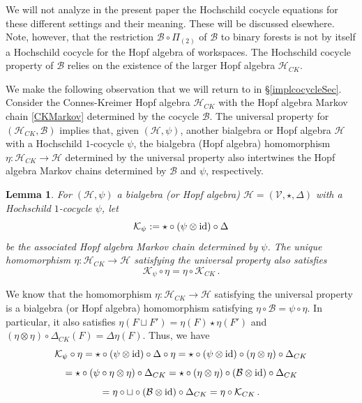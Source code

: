 \documentclass[12pt]{amsart}
\newtheorem{lem}[thm]{Lemma}
\numberwithin{equation}{section}
\def\cB{{\mathcal B}}
\def\cH{{\mathcal H}}
\def\cK{{\mathcal K}}
\def\cV{{\mathcal V}}
\begin{document}
We will not analyze in the present paper the Hochschild cocycle equations for
these different settings and their meaning. These will be discussed elsewhere.
Note, however, that the restriction $\cB \circ \Pi_{(2)}$ of $\cB$ to binary forests
is not by itself a Hochschild cocycle for the Hopf algebra of workspaces. The
Hochschild cocycle property of $\cB$ relies on the existence of the larger
Hopf algebra $\cH_{CK}$. 

\smallskip

We make the following observation that we will return to in \S \ref{implcocycleSec}.
Consider the Connes-Kreimer Hopf algebra $\cH_{CK}$ with the Hopf algebra Markov
chain \eqref{CKMarkov} determined by the cocycle $\cB$. The universal property for $(\cH_{CK},\cB)$
implies that, given $(\cH,\psi)$, another bialgebra or Hopf algebra $\cH$ with a Hochschild $1$-cocycle $\psi$,
the bialgebra (Hopf algebra) homomorphism $\eta: \cH_{CK} \to \cH$ determined by the universal
property also intertwines the Hopf algebra Markov chains determined by $\cB$ and $\psi$, respectively.

\begin{lem}\label{etaMarkov}
For $(\cH,\psi)$ a bialgebra (or Hopf algebra) $\cH=(\cV,\star,\Delta)$ with a Hochschild $1$-cocycle $\psi$, let
\begin{equation}\label{Kpsi}
\cK_\psi := \star \circ (\psi \otimes {\rm id}) \circ \Delta 
\end{equation}
be the associated Hopf algebra Markov chain determined by $\psi$. The unique homomorphism
$\eta: \cH_{CK} \to \cH$ satisfying the universal property also satisfies
\begin{equation}\label{etaK}
\cK_\psi \circ \eta = \eta \circ \cK_{CK} \, .
\end{equation}
\end{lem}

\proof We know that the homomorphism $\eta: \cH_{CK} \to \cH$ satisfying the universal property is
a bialgebra (or Hopf algebra) homomorphism satisfying $\eta \circ \cB = \psi \circ \eta$. In particular,
it also satisfies $\eta(F\sqcup F')=\eta(F)\star \eta(F')$ and $(\eta\otimes\eta)\circ \Delta_{CK}(F) = \Delta \eta(F)$.
Thus, we have
$$ \cK_\psi \circ \eta = \star \circ (\psi \otimes {\rm id}) \circ \Delta \circ \eta =
\star \circ (\psi \otimes {\rm id}) \circ (\eta\otimes\eta)\circ \Delta_{CK} $$
$$ = \star \circ (\psi \circ \eta \otimes \eta) \circ \Delta_{CK} = \star \circ (\eta\otimes \eta) \circ (\cB \otimes {\rm id}) \circ  \Delta_{CK} $$
$$ = \eta \circ \sqcup \circ (\cB \otimes {\rm id}) \circ  \Delta_{CK} = \eta \circ \cK_{CK}  \, . $$
\endproof
\end{document}
